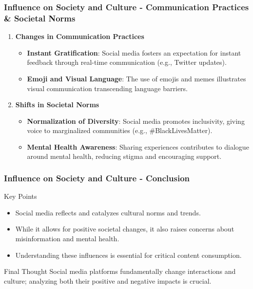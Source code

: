 \documentclass{beamer}
\begin{document}
\begin{frame}[fragile]
    \frametitle{Influence on Society and Culture - Communication Practices & Societal Norms}
    \begin{enumerate}
        \item \textbf{Changes in Communication Practices}
        \begin{itemize}
            \item \textbf{Instant Gratification}:
            Social media fosters an expectation for instant feedback through real-time communication (e.g., Twitter updates).
            \item \textbf{Emoji and Visual Language}:
            The use of emojis and memes illustrates visual communication transcending language barriers.
        \end{itemize}
        
        \item \textbf{Shifts in Societal Norms}
        \begin{itemize}
            \item \textbf{Normalization of Diversity}:
            Social media promotes inclusivity, giving voice to marginalized communities (e.g., #BlackLivesMatter).
            \item \textbf{Mental Health Awareness}:
            Sharing experiences contributes to dialogue around mental health, reducing stigma and encouraging support.
        \end{itemize}
    \end{enumerate}
\end{frame}

\begin{frame}[fragile]
    \frametitle{Influence on Society and Culture - Conclusion}
    \begin{block}{Key Points}
        \begin{itemize}
            \item Social media reflects and catalyzes cultural norms and trends.
            \item While it allows for positive societal changes, it also raises concerns about misinformation and mental health.
            \item Understanding these influences is essential for critical content consumption.
        \end{itemize}
    \end{block}
    \begin{block}{Final Thought}
        Social media platforms fundamentally change interactions and culture; analyzing both their positive and negative impacts is crucial.
    \end{block}
\end{frame}
\end{document}
